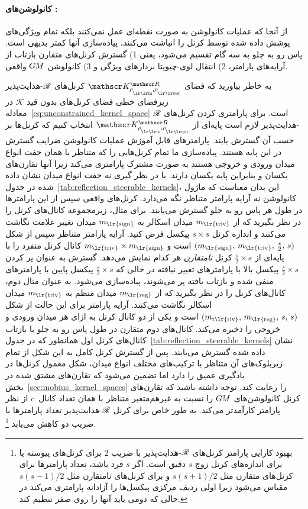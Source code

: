 \paragraph{کانولوشن‌های \textit{}:}
از آنجا که عملیات کانولوشن به صورت نقطه‌ای عمل نمی‌کنند بلکه تمام ویژگی‌های پوشش داده شده توسط کرنل را انباشت می‌کنند، پیاده‌سازی آنها کمتر بدیهی است.
پاس رو به جلو به سه گام تقسیم می‌شود، یعنی
1) گسترش کرنل‌های متقارن بازتاب از آرایه‌های پارامتر،
2) انتقال لوی-چیویتا بردارهای ویژگی و
3) کانولوشن $G\mkern-1.4muM$ واقعی.

به خاطر بیاورید که فضای $\KR$ کرنل‌های $\mathscr{R}$-هدایت‌پذیر زیرفضای خطی فضای کرنل‌های بدون قید $\mathscr{K}$ در معادله~\eqref{eq:unconstrained_kernel_space} است.
برای پارامتری کردن کرنل‌های $\mathscr{R}$-هدایت‌پذیر لازم است پایه‌ای از $\KR$ انتخاب کنیم که کرنل‌ها بر حسب آن گسترش یابند.
پارامترهای قابل آموزش عملیات کانولوشن ضرایب گسترش در این پایه هستند.
پیاده‌سازی ما تمام کرنل‌هایی را که متناظر با همان جفت انواع میدان ورودی و خروجی هستند به صورت مشترک پارامتری می‌کند
زیرا آنها تقارن‌های یکسان و بنابراین پایه یکسان دارند.
با در نظر گیری نه جفت انواع میدان نشان داده شده در جدول~\ref{tab:reflection_steerable_kernels}، این بدان معناست که ماژول کانولوشن نه آرایه پارامتر متناظر نگه می‌دارد.
کرنل‌های واقعی سپس از این پارامترها در طول هر پاس رو به جلو گسترش می‌یابند.
برای مثال، زیرمجموعه کانال‌های کرنل را در نظر بگیرید که از $m_{\textup{\lr{triv}}}$ میدان اسکالر به $m_{\textup{\lr{sign}}}$ میدان تغییر علامت نگاشت می‌کنند و اندازه کرنل $s\times s$ پیکسل فرض کنید.
آرایه پارامتر متناظر سپس از شکل $(m_{\textup{\lr{sign}}},\, m_{\textup{\lr{triv}}},\, \frac{s}{2},\, s)$ است و $m_{\textup{\lr{triv}}}\times m_{\textup{\lr{sign}}}$ کانال کرنل منفرد را با پایه‌ای از $\frac{s}{2}\times s$ کرنل \emph{نامتقارن} هر کدام نمایش می‌دهد.
گسترش به عنوان پر کردن $\frac{s}{2}\times s$ پیکسل بالا با پارامترهای تغییر نیافته در حالی که $\frac{s}{2}\times s$ پیکسل پایین با پارامترهای منفی شده و بازتاب یافته پر می‌شوند، پیاده‌سازی می‌شود.
به عنوان مثال دوم، کانال‌های کرنل را در نظر بگیرید که از $m_{\textup{\lr{reg}}}$ میدان منظم به $m_{\textup{\lr{triv}}}$ میدان اسکالر نگاشت می‌کنند.
آرایه پارامتر برای این حالت از شکل $(m_{\textup{t\lr{riv}}},\, m_{\textup{\lr{reg}}},\, s,\, s)$ است و یکی از دو کانال کرنل به ازای هر میدان ورودی و خروجی را ذخیره می‌کند.
کانال‌های دوم متقارن در طول پاس رو به جلو با بازتاب کانال‌های کرنل اول همانطور که در جدول~\ref{tab:reflection_steerable_kernels} نشان داده شده گسترش می‌یابند.
پس از گسترش کرنل کامل به این شکل از تمام زیربلوک‌های آن متناظر با ترکیب‌های مختلف انواع میدان، شکل معمول کرنل‌ها در یادگیری عمیق را دارد اما تضمین می‌شود که تقارن‌های مشتق شده در بخش~\ref{sec:mobius_kernel_spaces} را رعایت کند.
توجه داشته باشید که تقارن‌های کرنل کانولوشن‌های $G\mkern-1.4muM$ را نسبت به \CNN غیرهم‌متغیر متناظر با همان تعداد کانال~$c$ از نظر پارامتر کارآمدتر می‌کند.
به طور خاص برای کرنل $\mathscr{R}$-هدایت‌پذیر تعداد پارامترها با ضریب دو کاهش می‌یابد%
\footnote{
	بهبود کارایی پارامتر کرنل‌های $\mathscr{R}$-هدایت‌پذیر با ضریب $2$ برای کرنل‌های پیوسته یا برای اندازه‌های کرنل زوج $s$ دقیق است.
	اگر $s$ فرد باشد، تعداد پارامترها برای کرنل‌های متقارن مثل $s(s+1)/2$ و برای کرنل‌های نامتقارن مثل $s(s-1)/2$ مقیاس می‌شود زیرا اولی ردیف مرکزی پیکسل‌ها را آزادانه پارامتری می‌کند در حالی که دومی باید آنها را روی صفر تنظیم کند.
}.


